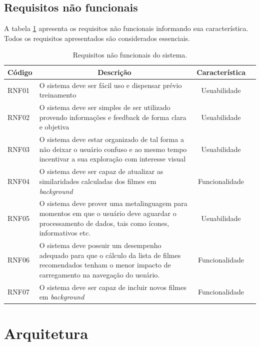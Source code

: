 \subsection{Requisitos não funcionais}

A tabela \ref{tab:req-nao-funcionais} apresenta os requisitos não funcionais informando sua característica. Todos os requisitos apresentados são considerados essenciais.

\begin{table}[H]
	\label{tab:req-nao-funcionais}
	\centering
	\caption{Requisitos não funcionais do sistema.}
	\def\arraystretch{1.3} %
	\begin{tabular}{| m{1.3cm} | m{9.4cm}| c | m{2cm}}
		\hline
		\multicolumn{1}{|c|}{\bfseries Código} & \multicolumn{1}{c|}{\bfseries Descrição} & \multicolumn{1}{c|}{\bfseries Característica} \\ \hline
		RNF01	& O sistema deve ser fácil uso e dispensar prévio treinamento	& Usuabilidade \\ \hline
		RNF02	& O sistema deve ser simples de ser utilizado provendo informações e feedback de forma clara e objetiva	& Usuabilidade \\ \hline
		RNF03	& O sistema deve estar organizado de tal forma a não deixar o usuário confuso e ao mesmo tempo incentivar a sua exploração com interesse visual	& Usuabilidade \\ \hline
		RNF04	& O sistema deve ser capaz de atualizar as similaridades calculadas dos filmes em \textit{background}	& Funcionalidade \\ \hline
		RNF05	& O sistema deve prover uma metalinguagem para momentos em que o usuário deve aguardar o processamento de dados, tais como ícones, informativos etc.	& Usuabilidade \\ \hline
		RNF06	& O sistema deve possuir um desempenho adequado para que o cálculo da lista de filmes recomendados tenham o menor impacto de carregamento na navegação do usuário.	& Funcionalidade \\ \hline
		RNF07	& O sistema deve ser capaz de incluir novos filmes em \textit{background}	& Funcionalidade \\ \hline	
	\end{tabular}
\end{table}

\section{Arquitetura}

